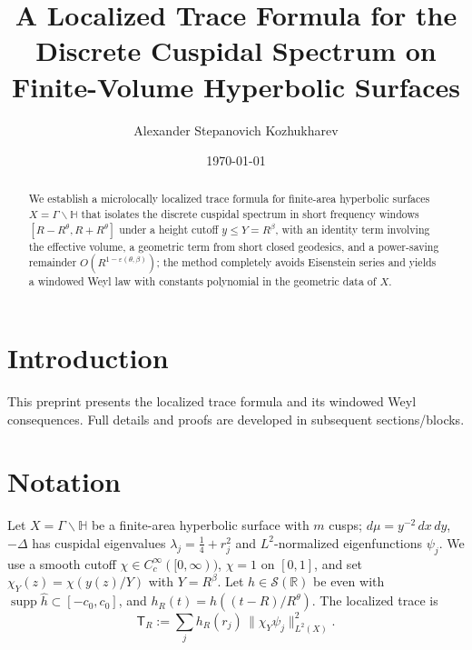 \documentclass[12pt]{amsart}
\title[A Localized Trace Formula]{A Localized Trace Formula for the Discrete Cuspidal Spectrum on Finite-Volume Hyperbolic Surfaces}
\author{Alexander Stepanovich Kozhukharev}
\date{\today}
\numberwithin{equation}{section}
\theoremstyle{plain}
\theoremstyle{definition}
\theoremstyle{remark}
\newcommand{\HH}{\mathbb{H}}
\newcommand{\RR}{\mathbb{R}}
\DeclareMathOperator{\supp}{supp}
\newcommand{\Lap}{\Delta}
\newcommand{\TR}{\mathsf{T}_R}
\begin{document}
\begin{abstract}
We establish a microlocally localized trace formula for finite-area hyperbolic surfaces $X=\Gamma\backslash\HH$ that isolates the discrete cuspidal spectrum in short frequency windows $[R-R^\theta,R+R^\theta]$ under a height cutoff $y\le Y=R^\beta$, with an identity term involving the effective volume, a geometric term from short closed geodesics, and a power-saving remainder $O(R^{1-\varepsilon(\theta,\beta)})$; the method completely avoids Eisenstein series and yields a windowed Weyl law with constants polynomial in the geometric data of $X$.
\end{abstract}


\maketitle

\tableofcontents



\section{Introduction}
This preprint presents the localized trace formula and its windowed Weyl consequences. Full details and proofs are developed in subsequent sections/blocks.

\section{Notation}
Let $X=\Gamma\backslash\HH$ be a finite-area hyperbolic surface with $m$ cusps; $d\mu=y^{-2}\,dx\,dy$, $-\Lap$ has cuspidal eigenvalues $\lambda_j=\tfrac14+r_j^2$ and $L^2$-normalized eigenfunctions $\psi_j$.
We use a smooth cutoff $\chi\in C_c^\infty([0,\infty))$, $\chi=1$ on $[0,1]$, and set $\chi_Y(z)=\chi(y(z)/Y)$ with $Y=R^\beta$.
Let $h\in\mathcal{S}(\RR)$ be even with $\supp \widehat{h}\subset[-c_0,c_0]$, and $h_R(t)=h((t-R)/R^\theta)$.
The localized trace is
\begin{equation}\label{eq:TR-def}
\TR := \sum_j h_R(r_j)\,\|\chi_Y\psi_j\|_{L^2(X)}^2.
\end{equation}
\end{document}
